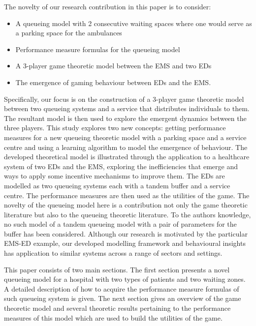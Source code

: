 The novelty of our research contribution in this paper is to consider:
\begin{itemize}
    \item A queueing model with 2 consecutive waiting spaces where one would 
    serve as a parking space for the ambulances
    \item Performance measure formulas for the queueing model
    \item A 3-player game theoretic model between the EMS and two EDs
    \item The emergence of gaming behaviour between EDs and the EMS.
\end{itemize}
Specifically, our focus is on the construction of a 3-player game theoretic 
model between two queueing systems and a service that distributes individuals
to them. 
The resultant model is then used to explore the emergent dynamics between 
the three players.
This study explores two new concepts: getting performance measures for a new
queueing theoretic model with a parking space and a service centre and
using a learning algorithm to model the emergence of behaviour.
The developed theoretical model is illustrated through the application to 
a healthcare system of two EDs and the EMS, exploring the inefficiencies that 
emerge and ways to apply some incentive mechanisms to improve them.
The EDs are modelled as two queueing systems each with a tandem buffer and a 
service centre.
The performance measures are then used as the utilities of the game.
The novelty of the queueing model here is a contribution not only the game 
theoretic literature but also to the queueing theoretic literature.
To the authors knowledge, no such model of a tandem queueing model with a pair 
of parameters for the buffer has been considered.
Although our research is motivated by the particular EMS-ED example, our 
developed modelling framework and behavioural insights has application to 
similar systems across a range of sectors and settings. 

This paper consists of two main sections.
The first section presents a novel queueing model for a hospital with two
types of patients and two waiting zones.
A detailed description of how to acquire the performance measure formulas of 
such queueing system is given.
The next section gives an overview of the game theoretic model and several
theoretic results pertaining to the performance measures of this model which 
are used to build the utilities of the game.